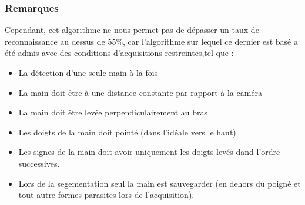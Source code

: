 \subsubsection{Remarques}
Cependant, cet algorithme ne nous permet pas de dépasser un taux de reconnaissance au dessus de 55\%, car l’algorithme sur lequel ce dernier est basé a été admis avec des conditions d’acquisitions restreintes,tel que :
\begin{itemize}
\item La détection d’une seule main à la fois
\item La main doit être à une distance constante par rapport à la caméra
\item La main doit être levée perpendiculairement au bras
\item Les doigts de la main doit pointé (dans l’idéale vers le haut)
\item Les signes de la main doit avoir uniquement les doigts levés dand l’ordre successives.
\item Lors de la segementation seul la main est sauvegarder (en dehors du poigné et tout autre formes parasites lors de l’acquisition).
\end{itemize}